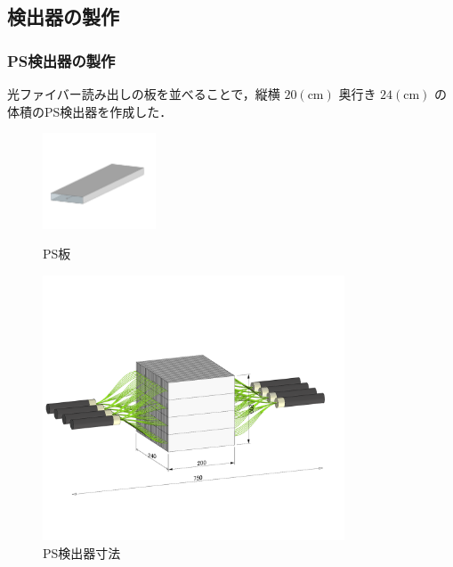 \subsection{検出器の製作}
\subsubsection{PS検出器の製作}

光ファイバー読み出しの板を並べることで，縦横 $20 (\mathrm{cm})$ 奥行き $24 (\mathrm{cm})$ の体積のPS検出器を作成した．

  \begin{figure}[H]
        \centering
        \includegraphics[width=0.3\textwidth]{figure/hayakawa/psmd.png}
        \caption{PS板}
        \centering
        \includegraphics[width=0.8\textwidth]{figure/hayakawa/p7.png}
        \caption{PS検出器寸法}
        \label{PS_sunpou}
  \end{figure}

